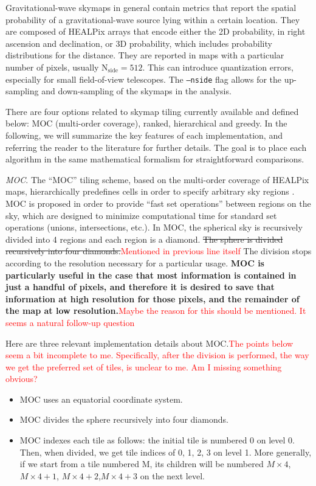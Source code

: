 \documentclass[twocolumn]{aastex62}
\begin{document}
Gravitational-wave skymaps in general contain metrics that report the spatial probability of a gravitational-wave source lying within a certain location.
They are composed of HEALPix arrays that encode either the 2D probability, in right ascension and declination, or 3D probability, which includes probability distributions for the distance.
They are reported in maps with a particular number of pixels, usually $\textrm{N}_\textrm{side} = 512$. 
This can introduce quantization errors, especially for small field-of-view telescopes. 
The \texttt{--nside} flag allows for the up-sampling and down-sampling of the skymaps in the analysis.

There are four options related to skymap tiling currently available and defined below: MOC (multi-order coverage), ranked, hierarchical and greedy.
In the following, we will summarize the key features of each implementation, and referring the reader to the literature for further details.
The goal is to place each algorithm in the same mathematical formalism for straightforward comparisons.

\emph{MOC}. The ``MOC'' tiling scheme, based on the multi-order coverage of HEALPix maps, hierarchically predefines cells in order to specify arbitrary sky regions \citep{FeBo2014}. 
MOC is proposed in order to provide ``fast set operations'' between regions on the sky, which are designed to minimize computational time for standard set operations (unions, intersections, etc.). In MOC, the spherical sky is recursively divided into 4 regions and each region is a diamond. 
\sout{The sphere is divided recursively into four diamonds.}\textcolor{red}{Mentioned in previous line itself}
The division stops according to the resolution necessary for a particular usage.
\textbf{MOC is particularly useful in the case that most information is contained in just a handful of pixels, and therefore it is desired to save that information at high resolution for those pixels, and the remainder of the map at low resolution.}\textcolor{red}{Maybe the reason for this should be mentioned. It seems a natural follow-up question}

Here are three relevant implementation details about MOC.\textcolor{red}{The points below seem a bit incomplete to me. Specifically, after the division is performed, the way we get the
preferred set of tiles, is unclear to me. Am I missing something obvious?}
\begin{itemize}
\item MOC uses an equatorial coordinate system. 
\item MOC divides the sphere recursively into four diamonds. 
\item MOC indexes each tile as follows: the initial tile is numbered 0 on level 0. Then, when divided, we get tile indices of 0, 1, 2, 3 on level 1. More generally, if we start from a tile numbered M, its children will be numbered $M\times 4$, $M\times 4 + 1$, $M\times 4 + 2$,$M\times 4 + 3$ on the next level.
\end{itemize}
\end{document}

